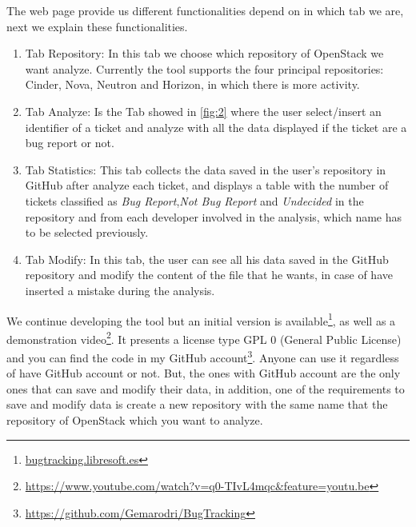 \documentclass[ifip]{svmult}
\begin{document}
The web page provide us different functionalities depend on in which tab we are, next we explain these functionalities.
\begin{enumerate}
  \item Tab Repository: In this tab we choose which repository of OpenStack we want analyze. Currently the tool supports the four principal repositories: Cinder, Nova, Neutron and Horizon, in which there is more activity.
  \item Tab Analyze: Is the Tab showed in \ref{fig:2} where the user select/insert an identifier of a ticket and analyze with all the data displayed if the ticket are a bug report or not.
  \item Tab Statistics: This tab collects the data saved in the user's repository in GitHub after analyze each ticket, and displays a table with the number of tickets classified as \textit{Bug Report},\textit{Not Bug Report} and \textit{Undecided} in the repository and from each developer involved in the analysis, which name has to be selected previously.
  \item Tab Modify: In this tab, the user can see all his data saved in the GitHub repository and modify the content of the file that he wants, in case of have inserted a mistake during the analysis.
\end{enumerate}

We continue developing the tool but an initial version is available\footnote{\url{bugtracking.libresoft.es}}, as well as a demonstration video\footnote{\url{https://www.youtube.com/watch?v=q0-TIvL4mqc&feature=youtu.be}}. It presents a license type GPL 0 (General Public License) and you can find the code in my GitHub account\footnote{\url{https://github.com/Gemarodri/BugTracking}}. Anyone can use it regardless of have GitHub account or not. But, the ones with GitHub account are the only ones that can save and modify their data, in addition, one of the requirements to save and modify data is create a new repository with the same name that the repository of OpenStack which you want to analyze.


\end{document}
